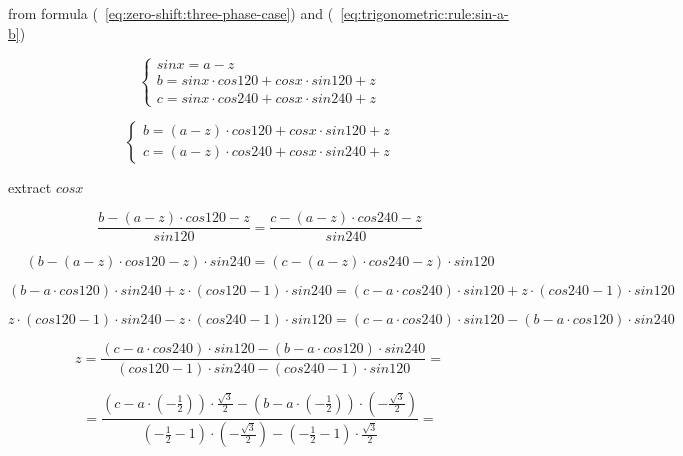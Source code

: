\documentclass[unicode, 12pt, a4paper]{article}
\begin{document}
from formula (~\ref{eq:zero-shift:three-phase-case}) and (~\ref{eq:trigonometric:rule:sin-a-b})

\begin{equation}
  \begin{cases}
    sin x = a - z\\
    b = sin x \cdot cos 120 + cos x \cdot sin 120 + z\\
    c = sin x \cdot cos 240 + cos x \cdot sin 240 + z
  \end{cases}
\end{equation}

\begin{equation}
  \begin{cases}
    b = (a - z) \cdot cos 120 + cos x \cdot sin 120 + z\\
    c = (a - z) \cdot cos 240 + cos x \cdot sin 240 + z
  \end{cases}
\end{equation}

extract $cos x$

\begin{equation}
  \frac{b - (a - z) \cdot cos 120 - z}{sin 120} = \frac{c - (a - z) \cdot cos 240 - z}{sin 240}
\end{equation}


\begin{equation}
  (b - (a - z) \cdot cos 120 - z) \cdot sin 240 = (c - (a - z) \cdot cos 240 - z) \cdot sin 120
\end{equation}

\begin{equation}
  (b - a \cdot cos 120) \cdot sin 240 + z \cdot (cos 120 - 1) \cdot sin 240 = (c - a \cdot cos 240) \cdot sin 120 + z \cdot (cos 240 - 1) \cdot sin 120
\end{equation}


\begin{equation}
  z \cdot (cos 120 - 1) \cdot sin 240  - z \cdot (cos 240 - 1) \cdot sin 120 = (c - a \cdot cos 240) \cdot sin 120 - (b - a \cdot cos 120) \cdot sin 240
\end{equation}


\begin{equation}
  z = \frac{(c - a \cdot cos 240) \cdot sin 120 - (b - a \cdot cos 120) \cdot sin 240}{(cos 120 - 1) \cdot sin 240  - (cos 240 - 1) \cdot sin 120} =
\end{equation}

\begin{equation}
  = \frac{(c - a \cdot (-\frac{1}{2})) \cdot \frac{\sqrt{3}}{2} - (b - a \cdot (-\frac{1}{2})) \cdot (-\frac{\sqrt{3}}{2})}{(-\frac{1}{2} - 1) \cdot (-\frac{\sqrt{3}}{2})  - (-\frac{1}{2} - 1) \cdot \frac{\sqrt{3}}{2}} =
\end{equation}
\end{document}
